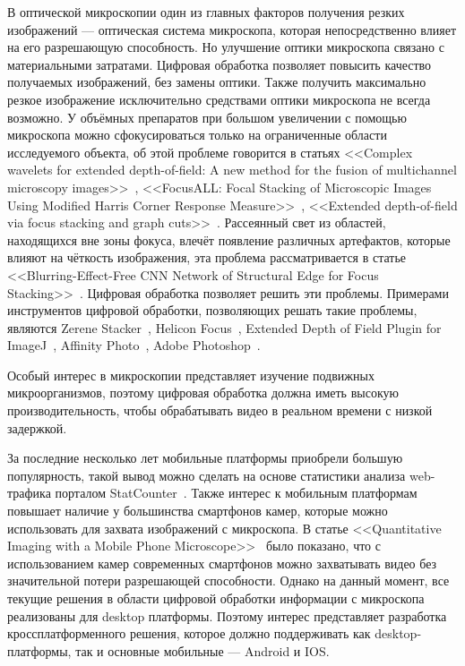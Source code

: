 \documentclass[14pt]{matmex-diploma-custom}
\begin{document}
В оптической микроскопии один из главных факторов получения резких изображений --- оптическая система микроскопа, которая непосредственно влияет на его разрешающую способность. Но улучшение оптики микроскопа связано с материальными затратами. Цифровая обработка позволяет повысить качество получаемых изображений, без замены оптики. Также получить максимально резкое изображение исключительно средствами оптики микроскопа не всегда возможно. У объёмных препаратов при большом увеличении с помощью микроскопа можно сфокусироваться только на ограниченные области исследуемого объекта, об этой проблеме говорится в статьях <<Complex wavelets for extended depth-of-field: A new method for the fusion of multichannel microscopy images>>~\cite{MethodForTheFusion}, <<FocusALL: Focal Stacking of Microscopic Images Using Modified Harris Corner Response Measure>>~\cite{ModifiedHarrisCorner}, <<Extended depth-of-field via focus stacking and graph cuts>>~\cite{ExtendedDepthOfField}. Рассеянный свет из областей, находящихся вне зоны фокуса, влечёт появление различных артефактов, которые влияют на чёткость изображения, эта проблема рассматривается в статье <<Blurring-Effect-Free CNN Network of Structural Edge for Focus Stacking>>~\cite{BlurringEffectFree}. Цифровая обработка позволяет решить эти проблемы. Примерами инструментов цифровой обработки, позволяющих решать такие проблемы, являются Zerene Stacker~\cite{ZereneStacker}, Helicon Focus~\cite{HeliconFocus}, Extended Depth of Field Plugin for ImageJ~\cite{ExtendedDepthOfField}, Affinity Photo~\cite{Affinity}, Adobe Photoshop~\cite{Photoshop}.
\par
Особый интерес в микроскопии представляет изучение подвижных микроорганизмов, поэтому цифровая обработка должна иметь высокую производительность, чтобы обрабатывать видео в реальном времени с низкой задержкой.
\par
За последние несколько лет мобильные платформы приобрели большую популярность, такой вывод можно сделать на основе статистики анализа web-трафика порталом StatCounter~\cite{StatCounter}. Также интерес к мобильным платформам повышает наличие у большинства смартфонов камер, которые можно использовать для захвата изображений с микроскопа. В статье <<Quantitative Imaging with a Mobile Phone Microscope>>~\cite{QuantImage} было показано, что с использованием камер современных смартфонов можно захватывать видео без значительной потери разрешающей способности. Однако на данный момент, все текущие решения в области цифровой обработки информации с микроскопа реализованы для desktop платформы. Поэтому интерес представляет разработка кроссплатформенного решения, которое должно поддерживать как desktop-платформы, так и основные мобильные --- Android и IOS.
\end{document}
